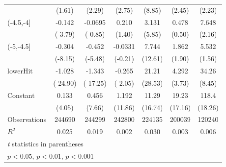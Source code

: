 {\begin{tabular}{l*{6}{c}}
                    &      (1.61)         &      (2.29)         &      (2.75)         &      (8.85)         &      (2.45)         &      (2.23)         \\
[1em]
(-4.5,-4]           &      -0.142\sym{***}&     -0.0695         &       0.210         &       3.131\sym{***}&       0.478         &       7.648\sym{*}  \\
                    &     (-3.79)         &     (-0.85)         &      (1.40)         &      (5.85)         &      (0.50)         &      (2.16)         \\
[1em]
(-5,-4.5]           &      -0.304\sym{***}&      -0.452\sym{***}&     -0.0331         &       7.744\sym{***}&       1.862         &       5.532         \\
                    &     (-8.15)         &     (-5.48)         &     (-0.21)         &     (12.61)         &      (1.90)         &      (1.56)         \\
[1em]
lowerHit            &      -1.028\sym{***}&      -1.343\sym{***}&      -0.265\sym{*}  &       21.21\sym{***}&       4.292\sym{***}&       34.26\sym{***}\\
                    &    (-24.90)         &    (-17.25)         &     (-2.05)         &     (28.53)         &      (3.73)         &      (8.45)         \\
[1em]
Constant            &       0.133\sym{***}&       0.456\sym{***}&       1.192\sym{***}&       11.29\sym{***}&       19.23\sym{***}&       118.4\sym{***}\\
                    &      (4.05)         &      (7.66)         &     (11.86)         &     (16.74)         &     (17.16)         &     (18.26)         \\
\hline
Observations        &      244690         &      244299         &      242800         &      224135         &      200039         &      120240         \\
\(R^{2}\)           &       0.025         &       0.019         &       0.002         &       0.030         &       0.003         &       0.006         \\
\hline\hline
\multicolumn{7}{l}{\footnotesize \textit{t} statistics in parentheses}\\
\multicolumn{7}{l}{\footnotesize \sym{*} \(p<0.05\), \sym{**} \(p<0.01\), \sym{***} \(p<0.001\)}\\
\end{tabular}
}
